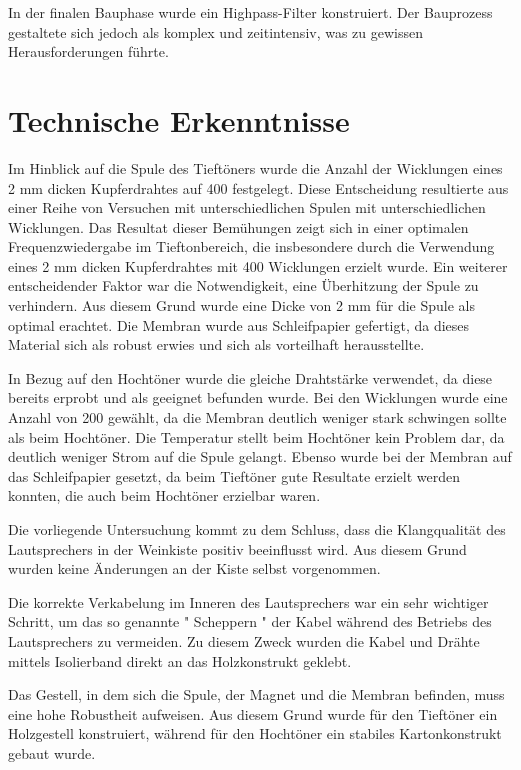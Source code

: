 \documentclass[a4paper,11pt]{report}
\begin{document}
In der finalen Bauphase wurde ein Highpass-Filter konstruiert. Der Bauprozess gestaltete sich jedoch als komplex und zeitintensiv, was zu gewissen Herausforderungen führte.        

\section{Technische Erkenntnisse}
Im Hinblick auf die Spule des Tieftöners wurde die Anzahl der Wicklungen eines 2 mm dicken Kupferdrahtes auf 400 festgelegt. Diese Entscheidung resultierte aus einer Reihe von Versuchen mit unterschiedlichen Spulen mit unterschiedlichen Wicklungen. Das Resultat dieser Bemühungen zeigt sich in einer optimalen Frequenzwiedergabe im Tieftonbereich, die insbesondere durch die Verwendung eines 2 mm dicken Kupferdrahtes mit 400 Wicklungen erzielt wurde.
Ein weiterer entscheidender Faktor war die Notwendigkeit, eine Überhitzung der Spule zu verhindern. Aus diesem Grund wurde eine Dicke von 2 mm für die Spule als optimal erachtet. Die Membran wurde aus Schleifpapier gefertigt, da dieses Material sich als robust erwies und sich als vorteilhaft herausstellte. 

In Bezug auf den Hochtöner wurde die gleiche Drahtstärke verwendet, da diese bereits erprobt und als geeignet befunden wurde. Bei den Wicklungen wurde eine Anzahl von 200 gewählt, da die Membran deutlich weniger stark schwingen sollte als beim Hochtöner. Die Temperatur stellt beim Hochtöner kein Problem dar, da deutlich weniger Strom auf die Spule gelangt. Ebenso wurde bei der Membran auf das Schleifpapier gesetzt, da beim Tieftöner gute Resultate erzielt werden konnten, die auch beim Hochtöner erzielbar waren.

Die vorliegende Untersuchung kommt zu dem Schluss, dass die Klangqualität des Lautsprechers in der Weinkiste positiv beeinflusst wird. Aus diesem Grund wurden keine Änderungen an der Kiste selbst vorgenommen.

Die korrekte Verkabelung im Inneren des Lautsprechers war ein sehr wichtiger Schritt, um das so genannte " Scheppern " der Kabel während des Betriebs des Lautsprechers zu vermeiden. Zu diesem Zweck wurden die Kabel und Drähte mittels Isolierband direkt an das Holzkonstrukt geklebt.

Das Gestell, in dem sich die Spule, der Magnet und die Membran befinden, muss eine hohe Robustheit aufweisen. Aus diesem Grund wurde für den Tieftöner ein Holzgestell konstruiert, während für den Hochtöner ein stabiles Kartonkonstrukt gebaut wurde.
\end{document}
